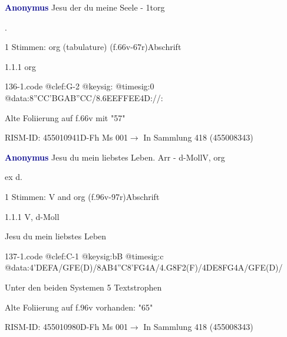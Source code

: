 \documentclass[twocolumn]{book}
\begin{document}
\par \vspace{7pt} \textcolor{darkblue}{\textbf{Anonymus  }}\hfillplus{\textbf{[136]}}\newline Jesu der du meine Seele - 1t\newline org
\par \begin{itshape}[f.66v, at left:] .\end{itshape} 
\par \textcolor{darkblue}{}  1 Stimmen: org (tabulature)  (f.66v-67r)\newline Abschrift
\par 1.1.1  org  
\begin{filecontents*}{136-1.code}
@clef:G-2
@keysig:
@timesig:0
@data:{8''CC'BG}{AB''CC}/{8.6EEFF}{EE}4D://:
\end{filecontents*}
\newline
%
\par Alte Foliierung auf f.66v mit "57"
\par RISM-ID: 455010941\newline D-Fh  Ms 001\newline $\rightarrow$ In Sammlung 418 (455008343)
      
\par \vspace{7pt} \textcolor{darkblue}{\textbf{Anonymus  }}\hfillplus{\textbf{[137]}}\newline Jesu du mein liebstes Leben. Arr - d-Moll\newline V, org
\par \begin{itshape}[f.96v, at left:] ex d.\end{itshape} 
\par \textcolor{darkblue}{}  1 Stimmen: V and org  (f.96v-97r)\newline Abschrift
\par 1.1.1  V, d-Moll\newline \begin{footnotesize} Jesu du mein liebstes Leben \end{footnotesize}  
\begin{filecontents*}{137-1.code}
@clef:C-1
@keysig:bB
@timesig:c
@data:4'DEFA/GFE(D)/{8AB}4''C{8'FG}4A/4.G8F2(F)/4DE{8FG}4A/GFE(D)/
\end{filecontents*}
\newline
%
\par Unter den beiden Systemen 5 Textstrophen
\par Alte Foliierung auf f.96v vorhanden: "65"
\par RISM-ID: 455010980\newline D-Fh  Ms 001\newline $\rightarrow$ In Sammlung 418 (455008343)
      
\end{document}
